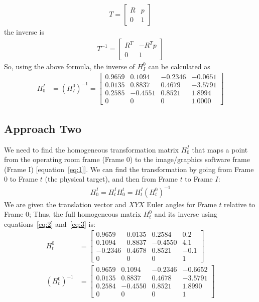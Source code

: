 \documentclass[12pt, a4paper]{article}
\begin{document}
\begin{align}
	T=
	\begin{bmatrix}
		R & p \\
		0 & 1
	\end{bmatrix} \label{eq:2}
\end{align}
the inverse is
\begin{align}
	T^{-1}=
	\begin{bmatrix}
		R^T & -R^T p \\
		0   & 1
	\end{bmatrix} \label{eq:3}
\end{align}
So, using the above formula, the inverse of \(H_I^0\) can be calculated as
\begin{align}
	H_0^I & = (H_I^0)^{-1} = \begin{bmatrix}
								0.9659 & 0.1094 & -0.2346 & -0.0651 \\
								0.0135 & 0.8837 & 0.4679 & -3.5791 \\
								0.2585 & -0.4551 & 0.8521 & 1.8994 \\
								0 & 0 & 0 & 1.0000
	                         \end{bmatrix}
\end{align}
\subsection*{Approach Two}
We need to find the homogeneous transformation matrix $H_0^I$ that maps a point from the operating room frame (Frame 0) to the image/graphics software frame (Frame I) [equation~\ref{eq:1}]. We can find the transformation by going from Frame 0 to Frame $t$ (the physical target), and then from Frame $t$ to Frame $I$:
\begin{align}
	H_0^I = H_t^I H_0^t = H_t^I (H_t^0)^{-1} \label{eq:5}
\end{align}
We are given the translation vector and $XYX$ Euler angles for Frame $t$ relative to Frame 0; Thus, the full homogeneous matrix $H_t^0$ and its inverse using equations~\ref{eq:2} and~\ref{eq:3} is:
\begin{align}
	H_t^0        & = \begin{bmatrix} 0.9659 & 0.0135 & 0.2584 & 0.2 \\ 0.1094 & 0.8837 & -0.4550 & 4.1 \\ -0.2346 & 0.4678 & 0.8521 & -0.1 \\ 0 & 0 & 0 & 1 \end{bmatrix}           \\
	(H_t^0)^{-1} & = \begin{bmatrix} 0.9659 & 0.1094 & -0.2346 & -0.6652 \\ 0.0135 & 0.8837 & 0.4678 & -3.5791 \\ 0.2584 & -0.4550 & 0.8521 & 1.8990 \\ 0 & 0 & 0 & 1 \end{bmatrix}
\end{align}
\end{document}
